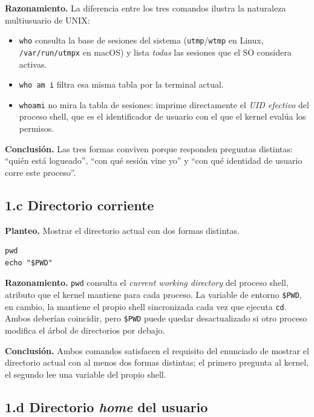 \documentclass[11pt,a4paper]{article}
\begin{document}
\textbf{Razonamiento.} La diferencia entre los tres comandos ilustra la
naturaleza multiusuario de UNIX:

\begin{itemize}[leftmargin=*]
    \item \texttt{who} consulta la base de sesiones del sistema
        (\texttt{utmp}/\texttt{wtmp} en Linux,
        \texttt{/var/run/utmpx} en macOS) y lista \emph{todas} las
        sesiones que el SO considera activas.
    \item \texttt{who am i} filtra esa misma tabla por la terminal
        actual.
    \item \texttt{whoami} no mira la tabla de sesiones: imprime
        directamente el \emph{UID efectivo} del proceso shell, que es
        el identificador de usuario con el que el kernel evalúa los
        permisos.
\end{itemize}

\textbf{Conclusión.} Las tres formas conviven porque responden
preguntas distintas: ``quién está logueado'', ``con qué sesión vine yo''
y ``con qué identidad de usuario corre este proceso''.

\subsection*{1.c Directorio corriente}

\textbf{Planteo.} Mostrar el directorio actual con dos formas distintas.

\begin{lstlisting}
pwd
echo "$PWD"
\end{lstlisting}

\textbf{Razonamiento.} \texttt{pwd} consulta el \emph{current working
directory} del proceso shell, atributo que el kernel mantiene para cada
proceso. La variable de entorno \texttt{\$PWD}, en cambio, la mantiene
el propio shell sincronizada cada vez que ejecuta \texttt{cd}. Ambos
deberían coincidir, pero \texttt{\$PWD} puede quedar desactualizado si
otro proceso modifica el árbol de directorios por debajo.

\textbf{Conclusión.} Ambos comandos satisfacen el requisito del
enunciado de mostrar el directorio actual con al menos dos formas
distintas; el primero pregunta al kernel, el segundo lee una variable
del propio shell.

\subsection*{1.d Directorio \emph{home} del usuario}
\end{document}
